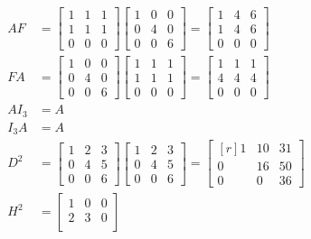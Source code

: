 \begin{align*}
	AF
	&=
	\begin{bmatrix*}
		1 & 1 & 1\\
		1 & 1 & 1\\
		0 & 0 & 0
	\end{bmatrix*}
	\begin{bmatrix*}
		1 & 0 & 0\\
		0 & 4 & 0\\
		0 & 0 & 6
	\end{bmatrix*}
	=
	\begin{bmatrix*}
		1 & 4 & 6\\
		1 & 4 & 6\\
		0 & 0 & 0
	\end{bmatrix*}
	\\
	FA
	&=
	\begin{bmatrix*}
		1 & 0 & 0\\
		0 & 4 & 0\\
		0 & 0 & 6
	\end{bmatrix*}
	\begin{bmatrix*}
		1 & 1 & 1\\
		1 & 1 & 1\\
		0 & 0 & 0
	\end{bmatrix*}
	=
	\begin{bmatrix*}
		1 & 1 & 1\\
		4 & 4 & 4\\
		0 & 0 & 0
	\end{bmatrix*}
	\\
	A I_3 &= A\\
	I_3 A &= A\\
	D^2
	&=
	\begin{bmatrix*}
		1 & 2 & 3\\
		0 & 4 & 5\\
		0 & 0 & 6
	\end{bmatrix*}
	\begin{bmatrix*}
		1 & 2 & 3\\
		0 & 4 & 5\\
		0 & 0 & 6
	\end{bmatrix*}
	=
	\begin{bmatrix*}[r]
		1 & 10  & 31\\
		0 & 16 & 50\\
		0 & 0  & 36
	\end{bmatrix*}
	\\
	H^2
	&=
	\begin{bmatrix*}
		1 & 0 & 0\\
		2 & 3 & 0\\

\end{bmatrix*}
\end{align*}
